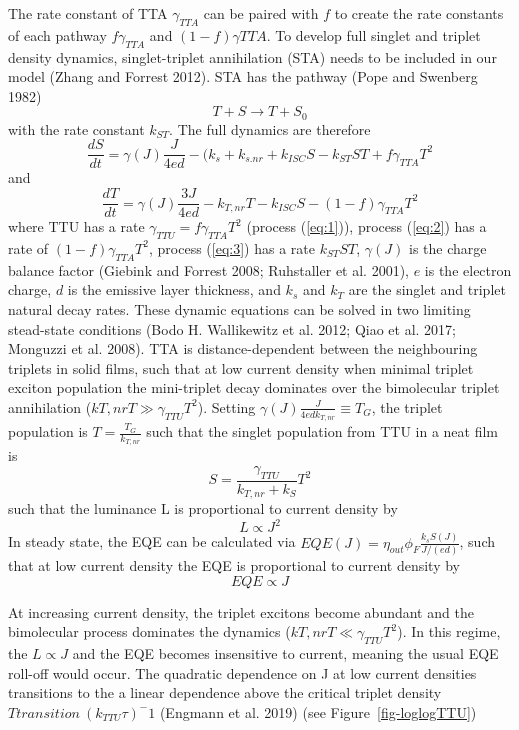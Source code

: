 \documentclass[
  letterpaper,
  DIV=11,
  numbers=noendperiod,
  oneside]{scrreprt}
\begin{document}
The rate constant of TTA \(\gamma_{TTA}\) can be paired with \(f\) to
create the rate constants of each pathway \(f\gamma_{TTA}\) and
\((1-f)\gamma{TTA}\). To develop full singlet and triplet density
dynamics, singlet-triplet annihilation (STA) needs to be included in our
model (Zhang and Forrest 2012). STA has the pathway (Pope and Swenberg
1982) \[\label{eq:3} 
    T + S \rightarrow T + S_0\] with the rate constant \(k_{ST}\). The
full dynamics are therefore
\[\frac{dS}{dt} = \gamma(J) \frac{J}{4ed} - (k_s+k_{s.nr}+k_{ISC}S - k_{ST}ST + f\gamma_{TTA}T^2\]
and
\[\frac{dT}{dt} = \gamma(J) \frac{3J}{4ed} - k_{T,nr}T - k_{ISC}S - (1-f)\gamma_{TTA}T^2\]
where TTU has a rate \(\gamma_{TTU}=f\gamma_{TTA}T^2\) (process
(\protect\hyperlink{eq:1}{{[}eq:1{]}})), process
(\protect\hyperlink{eq:2}{{[}eq:2{]}}) has a rate of
\((1-f)\gamma_{TTA}T^2\), process (\protect\hyperlink{eq:3}{{[}eq:3{]}})
has a rate \(k_{ST}ST\), \(\gamma(J)\) is the charge balance factor
(Giebink and Forrest 2008; Ruhstaller et al. 2001), \(e\) is the
electron charge, \(d\) is the emissive layer thickness, and \(k_s\) and
\(k_T\) are the singlet and triplet natural decay rates. These dynamic
equations can be solved in two limiting stead-state conditions (Bodo H.
Wallikewitz et al. 2012; Qiao et al. 2017; Monguzzi et al. 2008). TTA is
distance-dependent between the neighbouring triplets in solid films,
such that at low current density when minimal triplet exciton population
the mini-triplet decay dominates over the bimolecular triplet
annihilation (\(k{T,nr}T\gg \gamma_{TTU}T^2\)). Setting
\(\gamma(J)\frac{J}{4edk_{T,nr}} \equiv T_{G}\), the triplet population
is \(T = \frac{T_G}{k_{T,nr}}\) such that the singlet population from
TTU in a neat film is \[S = \frac{\gamma_{TTU}}{k_{T,nr}+k_S}T^2\] such
that the luminance L is proportional to current density by
\[L \propto J^2\] In steady state, the EQE can be calculated via
\(EQE(J) = \eta_{out}\phi_{F} \frac{k_sS(J)}{J/(ed)}\), such that at low
current density the EQE is proportional to current density by
\[EQE \propto J\]

At increasing current density, the triplet excitons become abundant and
the bimolecular process dominates the dynamics
(\(k{T,nr}T\ll \gamma_{TTU}T^2\)). In this regime, the \(L\propto J\)
and the EQE becomes insensitive to current, meaning the usual EQE
roll-off would occur. The quadratic dependence on J at low current
densities transitions to the a linear dependence above the critical
triplet density \(T{transition}\>(k_{TTU}\tau)^-1\) (Engmann et al.
2019) (see Figure~\ref{fig-loglogTTU})
\end{document}
